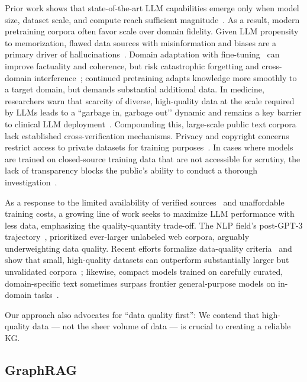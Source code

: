 \documentclass[10pt]{article}
\begin{document}
Prior work shows that state-of-the-art LLM capabilities emerge only when model size, dataset scale, and compute reach sufficient magnitude~\cite{NEURIPS2020_gpt3, kaplan2020scalinglaws, wei2022emergentabilities}. As a result, modern pretraining corpora often favor scale over domain fidelity. Given LLM propensity to memorization, flawed data sources with misinformation and biases are a primary driver of hallucinations~\cite{Huang_2025_survey}. Domain adaptation with fine-tuning~\cite{hu2022lora} can improve factuality and coherence, but risk catastrophic forgetting and cross-domain interference~\cite{wang-etal-2024-role}; continued pretraining adapts knowledge more smoothly to a target domain, but demands substantial additional data. In medicine, researchers warn that scarcity of diverse, high-quality data at the scale required by LLMs leads to a ``garbage in, garbage out'’ dynamic and remains a key barrier to clinical LLM deployment~\cite{Thirunavukarasu2023LLM}. Compounding this, large-scale public text corpora lack established cross-verification mechanisms. Privacy and copyright concerns restrict access to private datasets for training purposes~\cite{pereira2022, wang-etal-2024-notechat}. In cases where models are trained on closed-source training data that are not accessible for scrutiny, the lack of transparency blocks the public's ability to conduct a thorough investigation~\cite{nguyen-etal-2024-culturax}.

As a response to the limited availability of verified sources~\cite{gandhi-etal-2024-better, surveydatasynthesis} and unaffordable training costs, a growing line of work seeks to maximize LLM performance with less data, emphasizing the quality-quantity trade-off. The NLP field's post-GPT-3 trajectory~\cite{NEURIPS2020_gpt3}, prioritized ever-larger unlabeled web corpora, arguably underweighting data quality. Recent efforts formalize data-quality criteria~\cite{zheng2025properdatasetvaluation} and show that small, high-quality datasets can outperform substantially larger but unvalidated corpora~\cite{iskander-etal-2024-quality}; likewise, compact models trained on carefully curated, domain-specific text sometimes surpass frontier general-purpose models on in-domain tasks~\cite{Kadosh10938441, chen2023maybe05dataneeded}. 

Our approach also advocates for ``data quality first'': We contend that high-quality data --- not the sheer volume of data --- is crucial to creating a reliable KG. 

\subsection{GraphRAG}
\label{subsec:graphrag}
\end{document}

